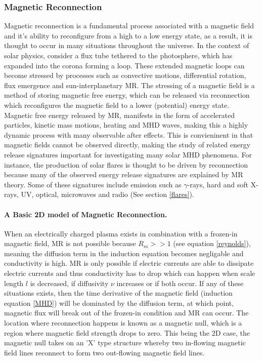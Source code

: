 \subsubsection{Magnetic Reconnection}\label{MR}
Magnetic reconnection is a fundamental process associated with a magnetic field and it's ability to reconfigure from a high to a low energy state, as a result, it is thought to occur in many situations throughout the universe. In the context of solar physics, consider a flux tube tethered to the photosphere, which has expanded into the corona forming a loop. These extended magnetic loops can become stressed by processes such as convective motions, differential rotation, flux emergence and sun-interplanetary MR. The stressing of a magnetic field is a method of storing magnetic free energy, which can be released via reconnection which reconfigures the magnetic field to a lower (potential) energy state. Magnetic free energy released by MR, manifests in the form of accelerated particles, kinetic mass motions, heating and MHD waves, making this a highly dynamic process with many observable after effects. This is convieninent in that magnetic fields cannot be observed directly, making the study of related energy release signatures important for investigating many solar MHD phenomena. For instance, the production of solar flares is thought to be driven by reconnection because many of the observed energy release signatures are explained by MR theory. Some of these signatures include emission such as $\gamma$-rays, hard and soft X-rays, UV, optical, microwaves and radio (See section \ref{flares}).

\paragraph{A Basic 2D model of Magnetic Reconnection.}
When an electrically charged plasma exists in combination with a frozen-in magnetic field, MR is not possible because $R_{m} >> 1$ (see equation \ref{reynolds}), meaning the diffusion term in the induction equation becomes negligable and conductivity is high. MR is only possible if electric currents are able to dissipate electric currents and thus conductivity has to drop which can happen when scale length $l$ is decreased, if diffusivity $\nu$ increases or if both occur. If any of these situations exists, then the time derivative of the magnetic field (induction equation \ref{MHD}) will be dominated by the diffusion term, at which point, magnetic flux will break out of the frozen-in condition and MR can occur. The location where reconnection happens is known as a magnetic null, which is a region where magnetic field strength drops to zero. This being the 2D case, the magnetic null takes on an 'X' type structure whereby two in-flowing magnetic field lines reconnect to form two out-flowing magnetic field lines. 

